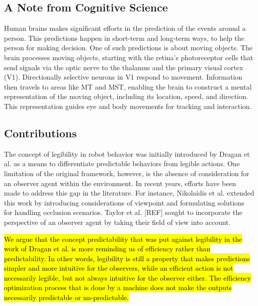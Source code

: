 \subsection{A Note from Cognitive Science}
Human brains makes significant efforts in the prediction of the events around a person. This predictions happen in short-term and long-term ways, to help the person for making decision. One of such predictions is about moving objects.
The brain processes moving objects, starting with the retina's photoreceptor cells that send signals via the optic nerve to the thalamus and the primary visual cortex (V1). Directionally selective neurons in V1 respond to movement. Information then travels to areas like MT and MST, enabling the brain to construct a mental representation of the moving object, including its location, speed, and direction. This representation guides eye and body movements for tracking and interaction.



\subsection{Contributions}
The concept of legibility in robot behavior was initially introduced by Dragan et al. \cite{dragan2013legibility} as a means to differentiate predictable behaviors from legible actions. One limitation of the original framework, however, is the absence of consideration for an observer agent within the environment. 
%
In recent years, efforts have been made to address this gap in the literature. For instance, Nikolaidis et al. \cite{nikolaidis2016based} extended this work by introducing considerations of viewpoint and formulating solutions for handling occlusion scenarios.
Taylor et al. [REF] sought to incorporate the perspective of an observer agent by taking their field of view into account. 

\hl{
    We argue that the concept predictability that was put against legibility in the work of Dragan et al. \cite{dragan2013legibility} is more reminding us of efficiency rather than predictability. In other words, legibility is still a property that makes predictions simpler and more intuitive for the observers, while an efficient action is not necessarily legible, but not always intuitive for the observer either. The efficiency optimization process that is done by a machine does not make the outputs necessarily predictable or un-predictable.
}

